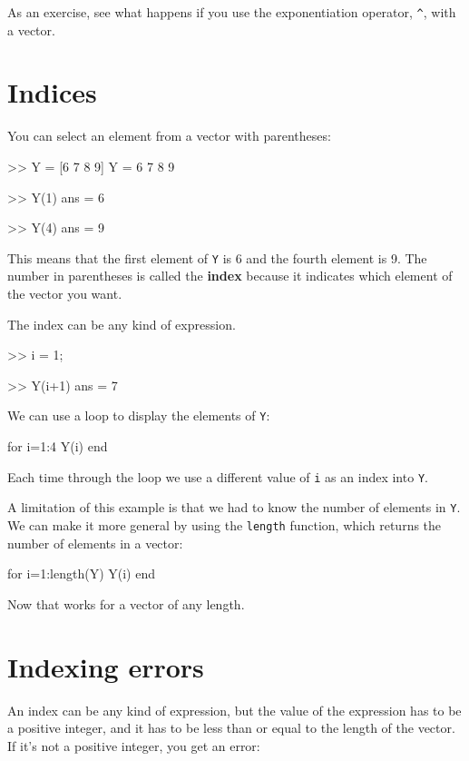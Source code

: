 \documentclass[
]{book}
\numberwithin{Answer}{chapter}
\numberwithin{Exercise}{chapter}
\begin{document}
As an exercise, see what happens if you use the exponentiation operator,
\verb"^", with a vector.


\section{Indices}

You can select an element from a vector with parentheses:

\begin{code}
>> Y = [6 7 8 9]
Y = 6    7     8     9

>> Y(1)
ans = 6

>> Y(4)
ans = 9
\end{code}

This means that the first element of {\tt Y} is 6 and the
fourth element is 9.
The number in parentheses is called the {\bf index} because it indicates which element of the vector you want.

The index can be any kind of expression.

\begin{code}
>> i = 1;

>> Y(i+1)
ans = 7
\end{code}

We can use a loop to display the elements of {\tt Y}:

\begin{code}
for i=1:4
     Y(i)
end
\end{code}

Each time through the loop we use a different value of {\tt i}
as an index into {\tt Y}.

A limitation of this example is that we had to know the number
of elements in {\tt Y}.  We can make it more general by using
the {\tt length} function, which returns the number of elements
in a vector:

\begin{code}
for i=1:length(Y)
     Y(i)
end
\end{code}

Now that works for a vector of any length.


\section{Indexing errors}

An index can be any kind of expression, but the value of the
expression has to be a positive integer, and it has to be
less than or equal to the length of the vector.  If it's
not a positive integer, you get an error:
\end{document}
